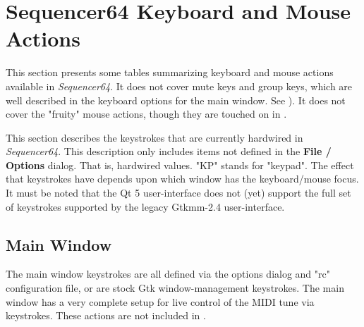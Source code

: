 %
%
%

\section{Sequencer64 Keyboard and Mouse Actions}
\label{sec:kbd_mouse_actions}

   This section presents some tables summarizing keyboard and mouse actions
   available in \textsl{Sequencer64}.
   It does not cover mute keys and group keys, which are well
   described in the keyboard options for the main window.
   See ).
   It does not cover the "fruity" mouse actions, though they are touched
   on in .


   This section describes the keystrokes that are currently hardwired
   in \textsl{Sequencer64}.
   This description only includes
   items not defined in the \textbf{File / Options}
   dialog.  That is, hardwired values.
   "KP" stands for "keypad".
   The effect that keystrokes have depends upon
   which window has the keyboard/mouse focus.
   It must be noted that the Qt 5 user-interface does not (yet) support the
   full set of keystrokes supported by the legacy Gtkmm-2.4 user-interface.

\subsection{Main Window}
\label{subsec:kbd_mouse_main_window}

   The main window keystrokes are all defined via the options dialog
   and "rc" configuration file, or are stock Gtk window-management keystrokes.
   The main window has a very complete setup for live control of the MIDI tune
   via keystrokes.  These actions are not included in
   .

